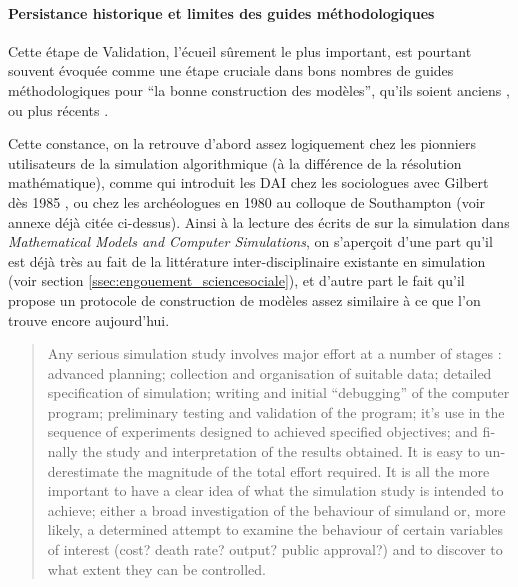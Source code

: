 \paragraph{Persistance historique et limites des guides méthodologiques}

Cette étape de Validation, l'écueil sûrement le plus important, est pourtant souvent évoquée comme une étape cruciale dans bons nombres de guides méthodologiques pour \enquote{la bonne construction des modèles}, qu'ils soient anciens \autocites[195]{Beshers1965}{Guetzkow1972, Dutton1971,Naylor1966, Naylor1967}, ou plus récents \autocite{Amblard2006, Gilbert2008}.

Cette constance, on la retrouve d'abord assez logiquement chez les pionniers utilisateurs de la simulation algorithmique (à la différence de la résolution mathématique), comme \textcite{Doran1975, Doran1986} qui introduit les DAI chez les sociologues avec Gilbert dès 1985 \autocite{Gilbert1985}, ou chez les archéologues en 1980 au colloque de Southampton \autocites{Doran1982, Renfrew1982} (voir annexe déjà citée ci-dessus). Ainsi à la lecture des écrits de \textcite[300-301]{Doran1975} sur la simulation dans \textit{Mathematical Models and Computer Simulations}, on s'aperçoit d'une part qu'il est déjà très au fait de la littérature inter-disciplinaire existante en simulation \autocite{Guetzkow1972} (voir section \ref{ssec:engouement_sciencesociale}), et d'autre part le fait qu'il propose un protocole de construction de modèles assez similaire à ce que l'on trouve encore aujourd'hui.

\foreignblockquote{english}[\cite{Guetzkow1972}]{Any serious simulation study involves major effort at a number of stages : advanced planning; collection and organisation of suitable data; detailed specification of simulation; writing and initial \enquote{debugging} of the computer program; preliminary testing and validation of the program; it's use in the sequence of experiments designed to achieved specified objectives; and finally the study and interpretation of the results obtained. It is easy to underestimate the magnitude of the total effort required. It is all the more important to have a clear idea of what the simulation study is intended to achieve; either a broad investigation of the behaviour of simuland or, more likely, a determined attempt to examine the behaviour of certain variables of interest (cost? death rate? output? public approval?) and to discover to what extent they can be controlled.}

